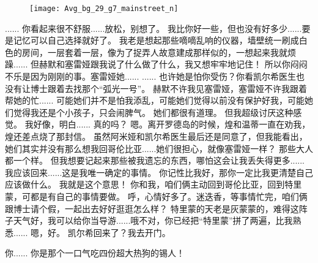 \documentclass[openany]{book}
\begin{document}
\begin{figure}[h]
    \centering
    \texttt{[image: Avg\_bg\_29\_g7\_mainstreet\_n]}
\end{figure}
\begin{dialogue}
     ......
     你看起来很不舒服......放松，别想了。
     我比你好一些，但也没有好多少......要是记忆可以自己选择就好了。
     我老是想起那些嘀嘀乱响的仪器，墙壁统一刷成白色的房间，一层套着一层，像为了捉弄人故意建成那样似的，一想起来我就烦躁......
     但赫默和塞雷娅跟我说了什么做了什么，我又想牢牢地记住！
     所以你闷闷不乐是因为刚刚的事。塞雷娅她......
     ......
     也许她是怕你受伤？你看凯尔希医生也没有让博士跟着去找那个“弧光一号”。
     赫默不许我见塞雷娅，塞雷娅不许我跟着帮她的忙......
     可能她们并不是怕我添乱，可能她们觉得以前没有保护好我，可能她们觉得我还是个小孩子，只会闹脾气。
     她们都很有道理。
     但我超级讨厌这种感觉。
     我好像，明白......
     真的吗？
     嗯。离开罗德岛的时候，煌和温蒂一直在劝我，煌还差点烧了那封信。
     虽然阿米娅和凯尔希医生最后还是同意了，但我能看出，她们其实并没有那么想我回哥伦比亚......她们很担心，就像塞雷娅一样？
     那些大人都一个样。
     但我想要记起来那些被我遗忘的东西，哪怕这会让我丢失得更多......
     我应该回来......这是我唯一确定的事情。
     你记性比我好，那你一定比我更清楚自己应该做什么。
     我就是这个意思！
     你和我，咱们俩主动回到哥伦比亚，回到特里蒙，可都是有自己的事情要做。
     呼，心情好多了。迷迭香，等事情忙完，咱们俩跟博士请个假，一起出去好好逛逛怎么样？
     特里蒙的天老是灰蒙蒙的，难得这阵子天气好，我可以给你当导游......哦不对，你已经把“特里蒙”拼了两遍，比我熟悉......
     嗯，好。
     凯尔希回来了？我去开门。\par
    \par
     你......
     你是那个一口气吃四份超大热狗的锡人！
\end{dialogue}
\end{document}
